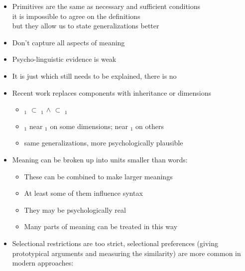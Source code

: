 \documentclass[headrule,footrule]{foils}
\begin{document}
\begin{itemize}
\item Primitives are the same as necessary and sufficient conditions
  \\ it is impossible to agree on the definitions
  \\ but they allow us to state generalizations better
\item Don't capture all aspects of meaning
\item Psycho-linguistic evidence is weak
\item It is just  which still needs to be explained,
  there is no 
\item Recent work replaces components with inheritance or dimensions
  \begin{itemize}
  \item {}$_1$ $\subset$ $_1$ $\wedge$  $\subset$
    $_1$
  \item {}$_1$ near $_1$ on some dimensions; near
    $_1$ on others
  \item same generalizations, more psychologically plausible
  \end{itemize}
\end{itemize}


\begin{itemize}
\item Meaning can be broken up into units smaller than words:   
  \begin{itemize}
  \item These can be combined to make larger meanings
  \item At least some of them influence syntax
  \item They may be psychologically real
  \item Many parts of meaning can be treated in this way
  \end{itemize}
\item {} Selectional restrictions are too strict,
  selectional preferences (giving prototypical arguments and measuring
  the similarity) are more common in modern approaches: 
\\ 
\end{itemize}
\end{document}
